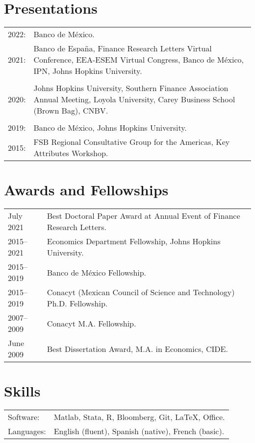 \documentclass[12pt]{article}
\newcommand{\vsect}{\vspace{0.08cm}}
\begin{document}
	\section{Presentations} 
	\vsect
	\begin{tabular}[l]{ll}
		2022: & Banco de México. \\
		2021: & \multirow{1}{15cm}{Banco de España, Finance Research Letters Virtual Conference, EEA-ESEM Virtual Congress, Banco de México, IPN, Johns Hopkins University.} \\ & \\ %
		2020: & \multirow{1}{15cm}{Johns Hopkins University, Southern Finance Association Annual Meeting, Loyola University, Carey Business School (Brown Bag), CNBV.} \\ & \\
		2019: & Banco de México,  Johns Hopkins University. \\
		2015: & FSB Regional Consultative Group for the Americas, Key Attributes Workshop. \\ %
	\end{tabular}

	
	\section{Awards and Fellowships}
	\vsect
	\begin{tabular}[l]{ll}
		July 2021 & Best Doctoral Paper Award at Annual Event of Finance Research Letters. \\
		2015–2021 & Economics Department Fellowship, Johns Hopkins University. \\
		2015–2019 & Banco de México Fellowship. \\
		2015–2019 & Conacyt (Mexican Council of Science and Technology) Ph.D. Fellowship. \\
		2007–2009 & Conacyt M.A. Fellowship. \\
		June 2009 & Best Dissertation Award, M.A. in Economics, CIDE. \\
	\end{tabular}

	
	\section{Skills} 
	\vsect
	\begin{tabular}[l]{ll}
		Software: & Matlab, Stata, R, Bloomberg, Git, \LaTeX, Office. \\ %
		Languages: & English (fluent), Spanish (native), French (basic). \\
	\end{tabular}
	\medskip
	
\end{document}
